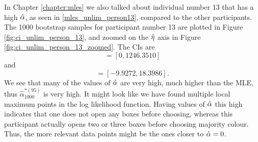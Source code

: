 In Chapter \ref{chapter:mles} we also talked about individual number 13 that has a high $\hat{\alpha}$, as seen in \eqref{mles_unlim_person13}, compared to the other participants. The 1000 bootstrap samples for participant number 13 are plotted in Figure \ref{fig:ci_unlim_person_13}, and zoomed on the $\hat{\eta}$ axis in Figure \ref{fig:ci_unlim_person_13_zoomed}. The CIs are
\begin{equation*}
    [\hat{\alpha}^{*(5)}_{1000},\hat{\alpha}^{*(95)}_{1000}] = [0,1246.3510]
\end{equation*}
and
\begin{equation*}
    [\hat{\eta}^{*(5)}_{1000},\hat{\eta}^{*(95)}_{1000}] = [-9.9272,18.3986].
\end{equation*}
We see that many of the values of $\hat{\alpha}$ are very high, much higher than the MLE, thus $\hat{\alpha}^{*(95)}_{1000}$ is very high.  It might look like we have found multiple local maximum points in the log likelihood function. Having values of $\hat{\alpha}$ this high indicates that one does not open any boxes before choosing, whereas this participant actually opens two or three boxes before choosing majority colour. Thus, the more relevant data points might be the ones closer to $\hat{\alpha}=0$. 

